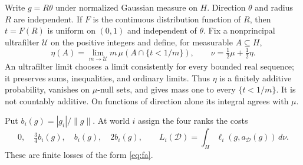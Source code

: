 \documentclass[11pt]{article}
\theoremstyle{remark}\newtheorem{remark}[theorem]{Remark}
\newcommand{\Dscr}{\mathcal D}
\begin{document}
Write $g=R\theta$ under normalized Gaussian measure on $H$. Direction
$\theta$ and radius $R$ are independent. If $F$ is the continuous distribution
function of $R$, then $t=F(R)$ is uniform on $(0,1)$ and independent of
$\theta$. Fix a nonprincipal ultrafilter $\mathcal U$ on the positive
integers and define, for measurable $A\subseteq H$,
\[
 \eta(A)=\lim_{m\to\mathcal U}m\,\mu(A\cap\{t<1/m\}),
 \qquad \nu=\tfrac12\mu+\tfrac12\eta.
\]
An ultrafilter limit chooses a limit consistently for every bounded real
sequence; it preserves sums, inequalities, and ordinary limits. Thus $\eta$
is a finitely additive probability, vanishes on $\mu$-null sets, and gives
mass one to every $\{t<1/m\}$. It is not countably additive. On functions
of direction alone its integral agrees with $\mu$.

Put $b_i(g)=|g_i|/\|g\|$. At world $i$ assign the four ranks the costs
\begin{equation}
 0,\quad \tfrac34 b_i(g),\quad b_i(g),\quad 2b_i(g),
 \qquad L_i(\Dscr)=\int_H\ell_i(g,a_\Dscr(g))\,d\nu.
 \label{eq:example}
\end{equation}
These are finite losses of the form \eqref{eq:fa}.
\end{document}

